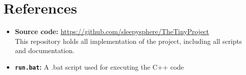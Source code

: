 \appendix
\chapter*{References}

\sloppy

\begin{itemize}
    \item \textbf{Source code:} \url{https://github.com/sleepysphere/TheTinyProject} \\
        This repository holds all implementation of the project, including all scripts and documentation.
    \item \textbf{\texttt{run.bat}:} A .bat script used for executing the C++ code \\
\end{itemize}
